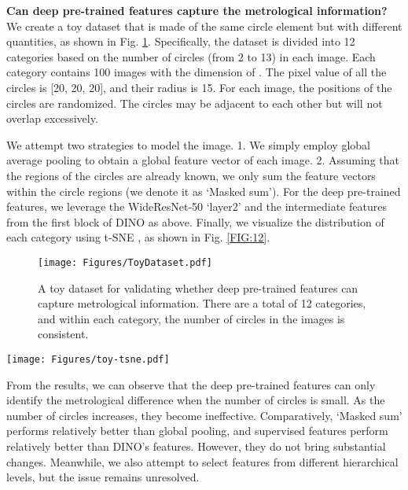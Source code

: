 \documentclass[final,5p,times,twocolumn]{elsarticle}
\begin{document}
\textbf{Can deep pre-trained features capture the metrological information?} We create a toy dataset that is made of the same circle element but with different quantities, as shown in Fig. \ref{FIG:11}. Specifically, the dataset is divided into 12 categories based on the number of circles (from 2 to 13) in each image. Each category contains 100 images with the dimension of . The pixel value of all the circles is [20, 20, 20], and their radius is 15. For each image, the positions of the circles are randomized. The circles may be adjacent to each other but will not overlap excessively.      

We attempt two strategies to model the image. 1. We simply employ global average pooling to obtain a global feature vector of each image. 2. Assuming that the regions of the circles are already known, we only sum the feature vectors within the circle regions (we denote it as `Masked sum'). For the deep pre-trained features, we leverage the WideResNet-50 `layer2' and the intermediate features from the first block of DINO as above. Finally, we visualize the distribution of each category using t-SNE \cite{van2008visualizing}, as shown in Fig. \ref{FIG:12}.
\begin{figure}
\centering
		\texttt{[image: Figures/ToyDataset.pdf]}\caption{A toy dataset for validating whether deep pre-trained features can capture metrological information. 
There are a total of 12 categories, and within each category, the number of circles in the images is consistent.}
	\label{FIG:11}
\end{figure}

\begin{figure*}
\centering
		\texttt{[image: Figures/toy-tsne.pdf]}\caption{
Visualization of the image distributions in our toy dataset under different pre-trained features and feature extraction strategies.}
	\label{FIG:12}
\end{figure*}


From the results, we can observe that the deep pre-trained features can only identify the metrological difference when the number of circles is small. As the number of circles increases, they become ineffective. Comparatively, `Masked sum' performs relatively better than global pooling, and supervised features perform relatively better than DINO's features. However, they do not bring substantial changes. Meanwhile, we also attempt to select features from different hierarchical levels, but the issue remains unresolved. 
\end{document}
